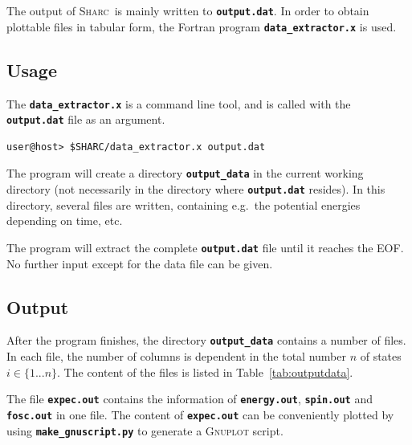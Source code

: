 \documentclass[a4paper,11pt,DIV=15,openany,twoside=false]{scrbook}
\newcommand{\sharc}{\textsc{Sharc}}
\newcommand{\ttt}[1]{\textbf{\texttt{#1}}}
\begin{document}
The output of \sharc\ is mainly written to \ttt{output.dat}. In order to obtain plottable files in tabular form, the Fortran program \ttt{data\_extractor.x} is used.

\subsection{Usage}

The \ttt{data\_extractor.x} is a command line tool, and is called with the \ttt{output.dat} file as an argument.
\begin{verbatim}
user@host> $SHARC/data_extractor.x output.dat
\end{verbatim}
The program will create a directory \ttt{output\_data} in the current working directory (not necessarily in the directory where \ttt{output.dat} resides). In this directory, several files are written, containing e.g.\ the potential energies depending on time, etc.

The program will extract the complete \ttt{output.dat} file until it reaches the EOF. No further input except for the data file can be given.

\subsection{Output}

After the program finishes, the directory \ttt{output\_data} contains a number of files. In each file, the number of columns is dependent in the total number $n$ of states $i\in\{1...n\}$. The content of the files is listed in Table~\ref{tab:outputdata}.

The file \ttt{expec.out} contains the information of \ttt{energy.out}, \ttt{spin.out} and \ttt{fosc.out} in one file. The content of \ttt{expec.out} can be conveniently plotted by using \ttt{make\_gnuscript.py} to generate a \textsc{Gnuplot} script.
\end{document}
